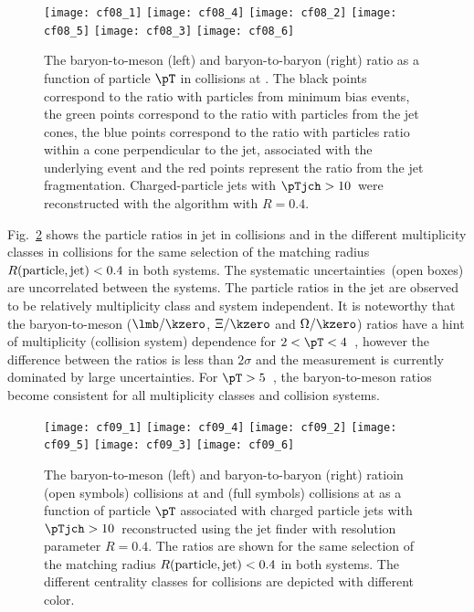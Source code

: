 \documentclass[ALICE,manyauthors]{cernphprep}
\begin{document}
\begin{figure}[!ht]
	\begin{center}
		\texttt{[image: cf08\_1]}
		\texttt{[image: cf08\_4]}
		\texttt{[image: cf08\_2]}
		\texttt{[image: cf08\_5]}
		\texttt{[image: cf08\_3]}
		\texttt{[image: cf08\_6]}
	\end{center}
	\caption{The baryon-to-meson (left) and baryon-to-baryon (right) ratio as a function of particle $\pT$ in \pPb collisions at \fivenn. The black points correspond to the ratio with particles from minimum bias events, the green points correspond to the ratio with particles from the jet cones, the blue points correspond to the ratio with particles ratio within a cone perpendicular to the jet, associated with the underlying event and the red points represent the ratio from the jet fragmentation. Charged-particle jets with $\pTjch > 10$~\GeVc were reconstructed with the \akT algorithm with $R = 0.4$.}
	\label{fig:pPbRatio}
\end{figure}

Fig.~\ref{fig:pppPbRatio} shows the particle ratios in jet in \pp collisions and in the different multiplicity classes in \pPb collisions for the same selection of the matching radius $R(\rm{particle, jet}) < 0.4$ in both systems.
The systematic uncertainties~(open boxes) are uncorrelated between the systems.
The particle ratios in the jet are observed to be relatively multiplicity class and system independent.
It is noteworthy that the baryon-to-meson ($\lmb/\kzero$, $\Xi/\kzero$ and $\Omega/\kzero$) ratios have a hint of multiplicity (collision system) dependence for $2 < \pT < 4$~\GeVc, however the difference between the ratios is less than $2\sigma$ and the measurement is currently dominated by large uncertainties.
For $\pT > 5$~\GeVc, the baryon-to-meson ratios become consistent for all multiplicity classes and collision systems. 

\begin{figure}[!ht]
	\begin{center}
		\texttt{[image: cf09\_1]}
		\texttt{[image: cf09\_4]}
		\texttt{[image: cf09\_2]}
		\texttt{[image: cf09\_5]}
		\texttt{[image: cf09\_3]}
		\texttt{[image: cf09\_6]}
	\end{center}
	\caption{The baryon-to-meson (left) and baryon-to-baryon (right) ratioin \pp (open symbols) collisions at \thirteen and \pPb (full symbols) collisions at \fivenn as a function of particle $\pT$ associated with charged particle jets with $\pTjch > 10$~\GeVc reconstructed using the \akT jet finder with resolution parameter $R = 0.4$. The ratios are shown for the same selection of the matching radius $R(\rm{particle, jet}) < 0.4$ in both systems. The different centrality classes for \pPb collisions are depicted with different color.}
	\label{fig:pppPbRatio}
\end{figure}
\end{document}
